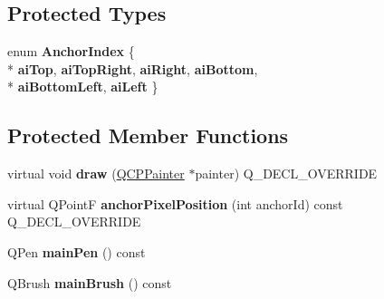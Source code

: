 \subsection*{Protected Types}
\begin{DoxyCompactItemize}
\item 
enum {\bfseries Anchor\+Index} \{ \\*
{\bfseries ai\+Top}, 
{\bfseries ai\+Top\+Right}, 
{\bfseries ai\+Right}, 
{\bfseries ai\+Bottom}, 
\\*
{\bfseries ai\+Bottom\+Left}, 
{\bfseries ai\+Left}
 \}\hypertarget{classQCPItemRect_af0ebba58e6bca4851c4db726691ec0d3}{}\label{classQCPItemRect_af0ebba58e6bca4851c4db726691ec0d3}

\end{DoxyCompactItemize}
\subsection*{Protected Member Functions}
\begin{DoxyCompactItemize}
\item 
virtual void {\bfseries draw} (\hyperlink{classQCPPainter}{Q\+C\+P\+Painter} $\ast$painter) Q\+\_\+\+D\+E\+C\+L\+\_\+\+O\+V\+E\+R\+R\+I\+DE\hypertarget{classQCPItemRect_a3c492960d0fc038cf1b60578b62b6cdc}{}\label{classQCPItemRect_a3c492960d0fc038cf1b60578b62b6cdc}

\item 
virtual Q\+PointF {\bfseries anchor\+Pixel\+Position} (int anchor\+Id) const Q\+\_\+\+D\+E\+C\+L\+\_\+\+O\+V\+E\+R\+R\+I\+DE\hypertarget{classQCPItemRect_a844027325b33a3b7eef424128ee5109c}{}\label{classQCPItemRect_a844027325b33a3b7eef424128ee5109c}

\item 
Q\+Pen {\bfseries main\+Pen} () const \hypertarget{classQCPItemRect_afa0fb7c6328a1e197ecd537de36daf8f}{}\label{classQCPItemRect_afa0fb7c6328a1e197ecd537de36daf8f}

\item 
Q\+Brush {\bfseries main\+Brush} () const \hypertarget{classQCPItemRect_ab0bd8e272e822ec851ba5b0c20e9200e}{}\label{classQCPItemRect_ab0bd8e272e822ec851ba5b0c20e9200e}

\end{DoxyCompactItemize}

